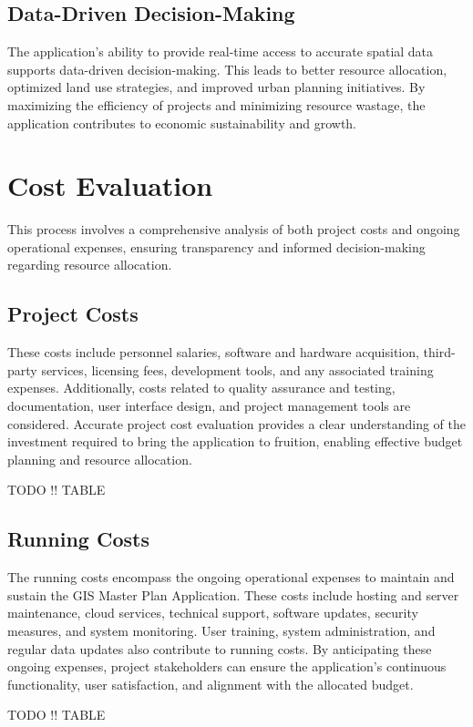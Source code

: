 \subsection{Data-Driven Decision-Making}\label{subsec:data-driven-decision-making}
The application's ability to provide real-time access to accurate spatial data supports data-driven decision-making.
This leads to better resource allocation, optimized land use strategies, and improved urban planning initiatives.
By maximizing the efficiency of projects and minimizing resource wastage, the application contributes to economic sustainability and growth.


\section{Cost Evaluation}\label{sec:cost-evaluation}
This process involves a comprehensive analysis of both project costs and ongoing operational expenses, ensuring transparency and informed decision-making regarding resource allocation.
\subsection{Project Costs}\label{subsec:project-costs}
These costs include personnel salaries, software and hardware acquisition, third-party services, licensing fees, development tools, and any associated training expenses.
Additionally, costs related to quality assurance and testing, documentation, user interface design, and project management tools are considered.
Accurate project cost evaluation provides a clear understanding of the investment required to bring the application to fruition, enabling effective budget planning and resource allocation.

TODO !! TABLE


\subsection{Running Costs}\label{subsec:running-costs}
The running costs encompass the ongoing operational expenses to maintain and sustain the GIS Master Plan Application.
These costs include hosting and server maintenance, cloud services, technical support, software updates, security measures, and system monitoring. 
User training, system administration, and regular data updates also contribute to running costs. 
By anticipating these ongoing expenses, project stakeholders can ensure the application's continuous functionality, user satisfaction, and alignment with the allocated budget.

TODO !! TABLE
